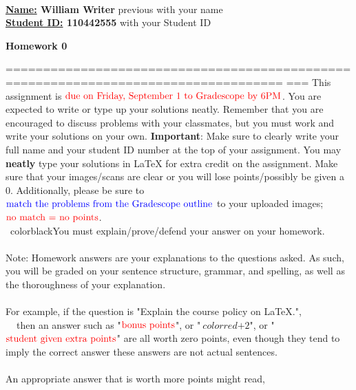 \documentclass[9pt]{article}
\date{}
\newcommand{\nin}{\noindent}
\newcommand{\vfive}{\vspace{5mm}}
\begin{document}
\begin{minipage}{0.65\textwidth}
\nin {\bf CSCI 2824 -- Fall 2023 } \\
{\bf \underline{Name:} William Writer} 
previous { } with your name\\
{\bf \underline{Student ID:} 110442555} 
with your Student ID
\end{minipage}\hfill
\begin{minipage}{0.35\textwidth}
\hfill {\bf Homework 0}%
\end{minipage}
%
===================================================================================
===
\vfive
\nin This assignment is $\color{red}{\text{due on Friday, September 1 to Gradescope
by 6PM}}$. You are expected to write or type up your solutions neatly. Remember
that you are encouraged to discuss problems with your classmates, but you must work
and write your solutions on your own.
{\bf Important}: Make sure to clearly write your full name and your student ID
number at the top of your assignment. You may {\bf neatly} type your solutions in
LaTeX for extra credit on the assignment. Make sure that your images/scans are
clear or you will lose points/possibly be given a 0. Additionally, please be sure
to $\color{blue}{\text{match the problems from the Gradescope outline}}$ to your
uploaded images; $\color{red}{\text{no match = no points}}$.\\
\textbf{\color{red}{Answers alone, correct or not, get no points.}} \
color{black}You must explain/prove/defend your answer on your homework.\\
\\
Note: Homework answers are your explanations to the questions asked. As such, you
will be graded on your sentence structure, grammar, and spelling, as well as the
thoroughness of your explanation.\\
\\
For example, if the question is "Explain the course policy on LaTeX.",\\
$\phantom{xx}$then an answer such as "$\color{red}{\text{bonus points}}$", or "$\
color{red}{\text{+2}}$", or "$\color{red}{\text{student given extra points}}$" are
all worth zero points, even though they tend to imply the correct answer these
answers are not actual sentences.\\
\\
An appropriate answer that is worth more points might read,\\
\end{document}
